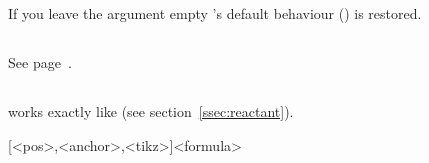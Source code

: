 \documentclass[toc=index,DIV10]{cnpkgdoc}
\begin{document}
If you leave the argument empty \mychemistry's default behaviour ()
is restored.
\begin{beispiel}
 \begin{rxn}
  \arrow{}{}
 \end{rxn}
 \setrxnalign{}
 \begin{rxn}
  \arrow{}{}
 \end{rxn}
\end{beispiel}

\subsection{}\label{ssec:setschemename}
See page~\pageref{par:rxnscheme_name}.

\subsection{}\label{ssec:transition}
 works exactly like  (see section~\ref{ssec:reactant}).
\begin{beschreibung}
 [<pos>,<anchor>,<tikz>]{<formula>}
\end{beschreibung}
\begin{beispiel}
 \begin{rxn}
  \arrow[below,<=>,.5]{}{}
  \arrow[below,<=>,.5]{}{}
 \end{rxn}
\end{beispiel}

\appendix
\printindex
\end{document}
